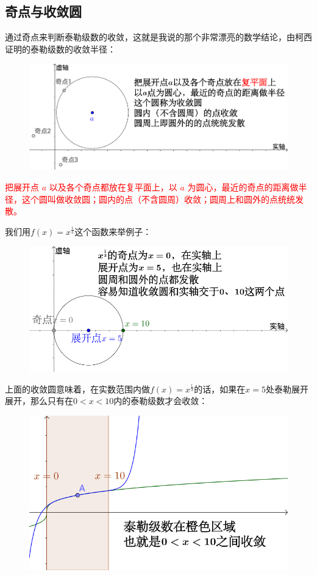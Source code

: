 \documentclass[12pt]{article}
\begin{document}
\subsection{奇点与收敛圆}
通过奇点来判断泰勒级数的收敛，这就是我说的那个非常漂亮的数学结论，由柯西证明的泰勒级数的收敛半径：
\begin{figure}[H]
  \centering
  \includegraphics[width=.8\textwidth]{fig/TaylorExpansion_cauchy.png} 
\end{figure}

\textcolor{red}{把展开点 $a$ 以及各个奇点都放在复平面上，以 $a$ 为圆心，最近的奇点的距离做半径，这个圆叫做收敛圆；圆内的点（不含圆周）收敛；圆周上和圆外的点统统发散。}

我们用$f(x)=x^{\frac{1}{3}}$这个函数来举例子：
\begin{figure}[H]
  \centering
  \includegraphics[width=.8\textwidth]{fig/TaylorExpansion_7.png} 
\end{figure}

上面的收敛圆意味着，在实数范围内做$f(x)=x^{\frac{1}{3}}$的话，如果在$x=5处$泰勒展开展开，那么只有在$0 < x < 10$内的泰勒级数才会收敛：
\begin{figure}[H]
  \centering
  \includegraphics[width=.8\textwidth]{fig/TaylorExpansion_8.png} 
\end{figure}
\end{document}
